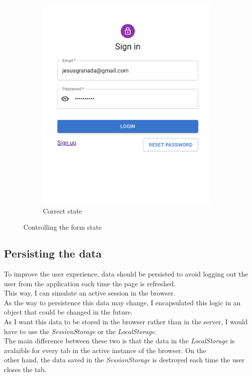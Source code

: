\begin{figure}[H]
\begin{subfigure}[T]{0.49\textwidth}
                \includegraphics[width=\textwidth]{assets/form_correct.png}
                \caption{Correct state}
                \label{fig:impl_form_correct}
            \end{subfigure}
            \caption{Controlling the form state}
            \label{fig:impl_form}
        \end{figure}

    \subsection{Persisting the data}
        To improve the user experience, data should be persisted to avoid logging out the user from the application each time the page is refreshed. \\
        This way, I can simulate an active session in the browser. \\
        As the way to persistence this data may change, I encapsulated this logic in an object that could be changed in the future. \\

        As I want this data to be stored in the browser rather than in the server, I would have to use the \textit{SessionStorage} or the \textit{LocalStorage}. \\
        The main difference between these two is that the data in the \textit{LocalStorage} is avalaible for every tab in the active instance of the browser. On the \\
        other hand, the data saved in the \textit{SessionStorage} is destroyed each time the user closes the tab. \\


